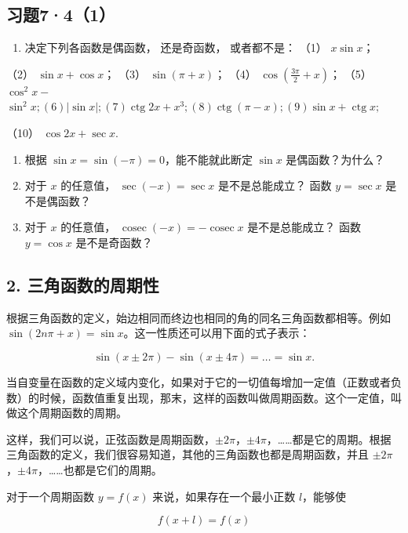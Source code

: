 \subsection{习题7·4（1）}

\begin{enumerate}
\item
  决定下列各函数是偶函数， 还是奇函数， 或者都不是： （1）
  \(x \sin x\)；
\end{enumerate}

（2） \(\sin x + \cos x\)； （3） \(\sin (\pi + x)\)； （4）
\(\cos \left(\frac{3\pi}{2} + x\right)\)； （5） \(\cos^2 x -\)
\(\sin^2 x; (6) |\sin x|; (7) \operatorname{ctg} 2x + x^3; (8) \operatorname{ctg} (\pi - x); (9) \sin x + \operatorname{ctg} x;\)

（10） \(\cos 2x + \sec x.\)

\begin{enumerate}[start=2]
\item
  根据 \(\sin x = \sin (-\pi) = 0\)，能不能就此断定 \(\sin x\)
  是偶函数？为什么？
\item
  对于 \(x\) 的任意值， \(\sec (-x) = \sec x\) 是不是总能成立？ 函数
  \(y = \sec x\) 是不是偶函数？
\item
  对于 \(x\) 的任意值，
  \(\operatorname{cosec} (-x) = -\operatorname{cosec} x\)
  是不是总能成立？ 函数 \(y = \cos x\) 是不是奇函数？
\end{enumerate}

\subsection{2. 三角函数的周期性}

根据三角函数的定义，始边相同而终边也相同的角的同名三角函数都相等。例如
\(\sin (2n\pi + x) = \sin x\)。这一性质还可以用下面的式子表示：

\[
\sin (x \pm 2 \pi) - \sin (x \pm 4 \pi) = \dots = \sin x.
\]

当自变量在函数的定义域内变化，如果对于它的一切值每增加一定值（正数或者负数）的时候，函数值重复出现，那末，这样的函数叫做周期函数。这个一定值，叫做这个周期函数的周期。

这样，我们可以说，正弦函数是周期函数，\(\pm 2\pi\)，\(\pm 4\pi\)，\ldots\ldots 都是它的周期。根据三角函数的定义，我们很容易知道，其他的三角函数也都是周期函数，并且
\(\pm 2\pi\)，\(\pm 4\pi\)，\ldots\ldots 也都是它们的周期。

对于一个周期函数 \(y = f(x)\) 来说，如果存在一个最小正数 \(l\)，能够使

\[
f (x + l) = f (x)
\]

